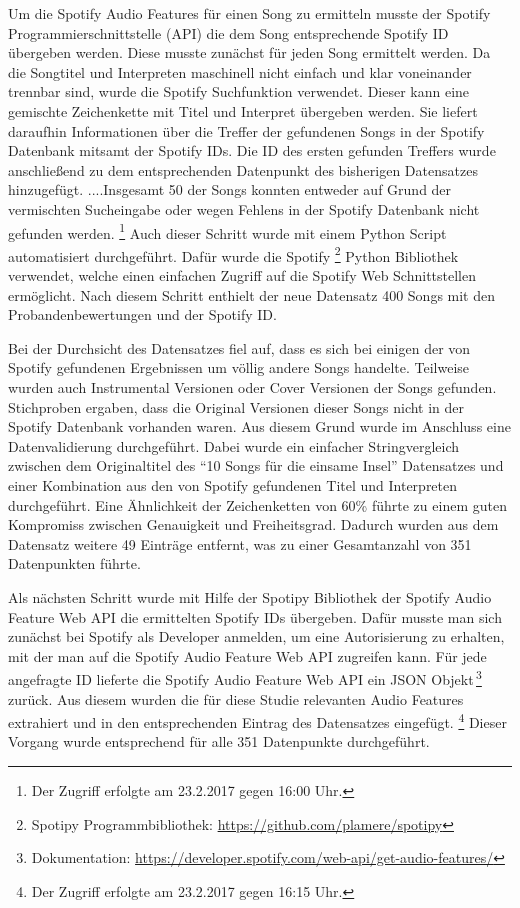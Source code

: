 Um die Spotify Audio Features für einen Song zu ermitteln musste der Spotify Programmierschnittstelle (API) die dem Song entsprechende Spotify ID übergeben werden.
Diese musste zunächst für jeden Song ermittelt werden.
Da die Songtitel und Interpreten maschinell nicht einfach und klar voneinander trennbar sind, wurde die Spotify Suchfunktion verwendet.
Dieser kann eine gemischte Zeichenkette mit Titel und Interpret übergeben werden.
Sie liefert daraufhin Informationen über die Treffer der gefundenen Songs in der Spotify Datenbank mitsamt der Spotify IDs.
Die ID des ersten gefunden Treffers wurde anschließend zu dem entsprechenden Datenpunkt des bisherigen Datensatzes hinzugefügt.
....Insgesamt 50 der Songs konnten entweder auf Grund der vermischten Sucheingabe oder wegen Fehlens in der Spotify Datenbank nicht gefunden werden.
\footnote{Der Zugriff erfolgte am 23.2.2017 gegen 16:00 Uhr.}
Auch dieser Schritt wurde mit einem Python Script automatisiert durchgeführt.
Dafür wurde die Spotify \footnote{Spotipy Programmbibliothek: \url{https://github.com/plamere/spotipy}} Python Bibliothek verwendet, welche einen einfachen Zugriff auf die Spotify Web Schnittstellen ermöglicht.
Nach diesem Schritt enthielt der neue Datensatz 400 Songs mit den Probandenbewertungen und der Spotify ID.

Bei der Durchsicht des Datensatzes fiel auf, dass es sich bei einigen der von Spotify gefundenen Ergebnissen um völlig andere Songs handelte.
Teilweise wurden auch Instrumental Versionen oder Cover Versionen der Songs gefunden.
Stichproben ergaben, dass die Original Versionen dieser Songs nicht in der Spotify Datenbank vorhanden waren.
Aus diesem Grund wurde im Anschluss eine Datenvalidierung durchgeführt.
Dabei wurde ein einfacher Stringvergleich zwischen dem Originaltitel des "`10 Songs für die einsame Insel"' Datensatzes und einer Kombination aus den von Spotify gefundenen Titel und Interpreten durchgeführt.
Eine Ähnlichkeit der Zeichenketten von 60\% führte zu einem guten Kompromiss zwischen Genauigkeit und Freiheitsgrad.
Dadurch wurden aus dem Datensatz weitere 49 Einträge entfernt, was zu einer Gesamtanzahl von 351 Datenpunkten führte.

Als nächsten Schritt wurde mit Hilfe der Spotipy Bibliothek der Spotify Audio Feature Web API die ermittelten Spotify IDs übergeben.
Dafür musste man sich zunächst bei Spotify als Developer anmelden, um eine Autorisierung zu erhalten, mit der man auf die Spotify Audio Feature Web API zugreifen kann.
Für jede angefragte ID lieferte die Spotify Audio Feature Web API ein JSON Objekt\,\footnote{Dokumentation: \url{https://developer.spotify.com/web-api/get-audio-features/}} zurück.
Aus diesem wurden die für diese Studie relevanten Audio Features extrahiert und in den entsprechenden Eintrag des Datensatzes eingefügt.
\footnote{Der Zugriff erfolgte am 23.2.2017 gegen 16:15 Uhr.}
Dieser Vorgang wurde entsprechend für alle 351 Datenpunkte durchgeführt.

